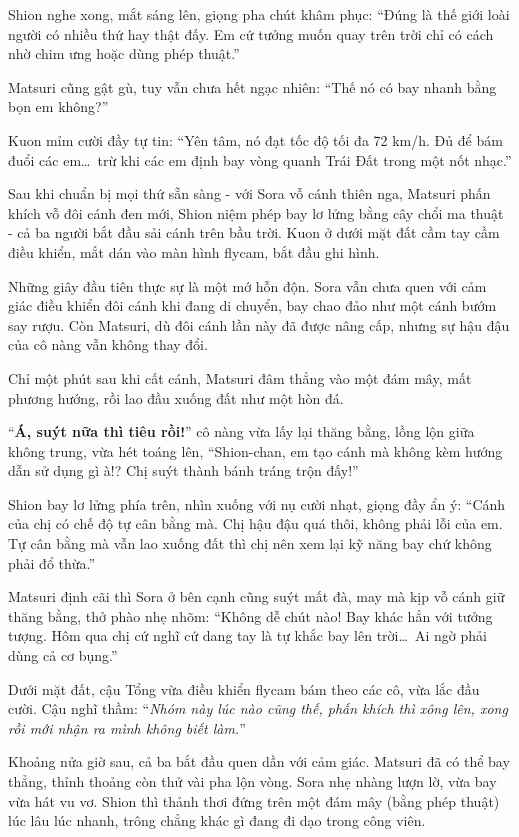\documentclass[../main.tex]{subfiles}
\begin{document}
Shion nghe xong, mắt sáng lên, giọng pha chút khâm phục: ``Đúng là thế giới loài người có nhiều thứ hay thật đấy. Em cứ tưởng muốn quay trên trời chỉ có cách nhờ chim ưng hoặc dùng phép thuật.''

Matsuri cũng gật gù, tuy vẫn chưa hết ngạc nhiên: ``Thế nó có bay nhanh bằng bọn em không?''

Kuon mỉm cười đầy tự tin: ``Yên tâm, nó đạt tốc độ tối đa 72 km/h. Đủ để bám đuổi các em\dots\ trừ khi các em định bay vòng quanh Trái Đất trong một nốt nhạc.''

Sau khi chuẩn bị mọi thứ sẵn sàng - với Sora vỗ cánh thiên nga, Matsuri phấn khích vỗ đôi cánh đen mới, Shion niệm phép bay lơ lửng bằng cây chổi ma thuật - cả ba người bắt đầu sải cánh trên bầu trời. Kuon ở dưới mặt đất cầm tay cầm điều khiển, mắt dán vào màn hình flycam, bắt đầu ghi hình.

Những giây đầu tiên thực sự là một mớ hỗn độn. Sora vẫn chưa quen với cảm giác điều khiển đôi cánh khi đang di chuyển, bay chao đảo như một cánh bướm say rượu. Còn Matsuri, dù đôi cánh lần này đã được nâng cấp, nhưng sự hậu đậu của cô nàng vẫn không thay đổi.

Chỉ một phút sau khi cất cánh, Matsuri đâm thẳng vào một đám mây, mất phương hướng, rồi lao đầu xuống đất như một hòn đá.


``\textbf{Á, suýt nữa thì tiêu rồi!}'' cô nàng vừa lấy lại thăng bằng, lồng lộn giữa không trung, vừa hét toáng lên, ``Shion-chan, em tạo cánh mà không kèm hướng dẫn sử dụng gì à!? Chị suýt thành bánh tráng trộn đấy!''

Shion bay lơ lửng phía trên, nhìn xuống với nụ cười nhạt, giọng đầy ẩn ý: ``Cánh của chị có chế độ tự cân bằng mà. Chị hậu đậu quá thôi, không phải lỗi của em. Tự cân bằng mà vẫn lao xuống đất thì chị nên xem lại kỹ năng bay chứ không phải đổ thừa.''

Matsuri định cãi thì Sora ở bên cạnh cũng suýt mất đà, may mà kịp vỗ cánh giữ thăng bằng, thở phào nhẹ nhõm: ``Không dễ chút nào! Bay khác hẳn với tưởng tượng. Hôm qua chị cứ nghĩ cứ dang tay là tự khắc bay lên trời\dots\ Ai ngờ phải dùng cả cơ bụng.''

Dưới mặt đất, cậu Tổng vừa điều khiển flycam bám theo các cô, vừa lắc đầu cười. Cậu nghĩ thầm: ``\textit{Nhóm này lúc nào cũng thế, phấn khích thì xông lên, xong rồi mới nhận ra mình không biết làm.}''

Khoảng nửa giờ sau, cả ba bắt đầu quen dần với cảm giác. Matsuri đã có thể bay thẳng, thỉnh thoảng còn thử vài pha lộn vòng. Sora nhẹ nhàng lượn lờ, vừa bay vừa hát vu vơ. Shion thì thảnh thơi đứng trên một đám mây (bằng phép thuật) lúc lâu lúc nhanh, trông chẳng khác gì đang đi dạo trong công viên.
\end{document}
